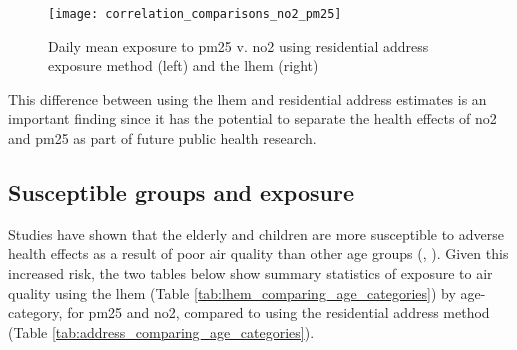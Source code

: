 \begin{figure}[H]
\centering
\texttt{[image: correlation\_comparisons\_no2\_pm25]}
\caption{Daily mean exposure to \gls{pm25} v. \gls{no2} using residential address exposure method (left) and the \gls{lhem} (right)}
\label{fig:correlation_comparisons_no2_pm25}
\end{figure}

This difference between using the \gls{lhem} and residential address estimates is an important finding since it has the potential to separate the health effects of \gls{no2} and \gls{pm25} as part of future public health research.

\subsection{Susceptible groups and exposure}
\label{subsec:susceptible_groups}

Studies have shown that the elderly and children are more susceptible to adverse health effects as a result of poor air quality than other age groups (\cite{Wang2015}, \cite{WorldHealthOrganization2013a}). Given this increased risk, the two tables below show summary statistics of exposure to air quality using the \gls{lhem} (Table \ref{tab:lhem_comparing_age_categories}) by age-category, for \gls{pm25} and \gls{no2}, compared to using the residential address method (Table \ref{tab:address_comparing_age_categories}).

